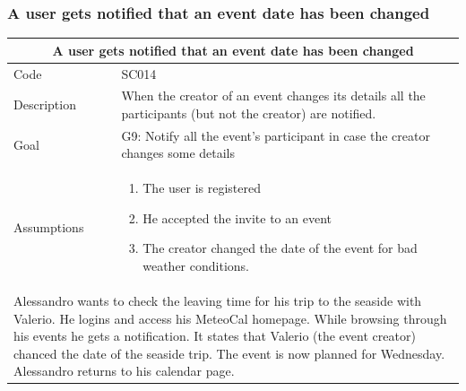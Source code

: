 \documentclass[10pt,a4paper,titlepage]{article}
\begin{document}
\subsubsection{A user gets notified that an event date has been changed}
\begin{tabular}{| p{3cm} | p{10cm} |}
\hline \multicolumn{2}{|c|}{\textbf{A user gets notified that an event date has been changed}} \\ 
\hline Code & SC014 \\ 
\hline Description & When the creator of an event changes its details all the participants (but not the creator) are notified.\\
\hline Goal & G9: Notify all the event's participant in case the creator changes some details\\
\hline Assumptions  & \begin{enumerate}
\item The user is registered
\item He accepted the invite to an event
\item The creator changed the date of the event for bad weather conditions.
\end{enumerate} \\
\hline \multicolumn{2}{|p{13cm}|}{Alessandro wants to check the leaving time for his trip to the seaside with Valerio. He logins and access his MeteoCal homepage. While browsing through his events he gets a notification.  It states that Valerio (the event creator) chanced the date of the seaside trip. The event is now planned for Wednesday. Alessandro returns to his calendar page.}\\
\hline
\end{tabular}
\end{document}

